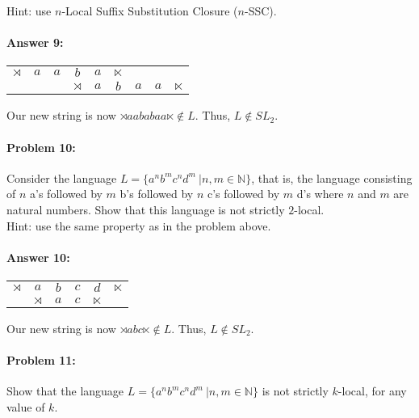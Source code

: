 \documentclass[12pt, letterpaper]{article}
\begin{document}
\noindent Hint: use $n$-Local Suffix Substitution Closure ($n$-SSC).

\paragraph{Answer 9:}\begin{center}
\begin{tabular}{cccc|c|cccc}
    $\rtimes$ & $a$ & $a$ & $b$ & $a$ & $\ltimes$  \\
    & & & $\rtimes$ & $a$ & $b$ & $a$ & $a$ & $\ltimes$
\end{tabular}    
\end{center}

Our new string is now $\rtimes aababaa \ltimes \notin L$. Thus, $L \notin SL_2$.

\hrulefill
\paragraph{Problem 10:}

Consider the language
$L= \{a^n b^m c^n d^m\ | n, m \in \mathbb{N} \}$, that is, the
language consisting of $n$ a's followed by $m$ b's followed by $n$ c's
followed by $m$ d's where $n$ and $m$ are
natural numbers. Show that this language is not strictly $2$-local.\\

\noindent Hint: use the same property as in the problem above.

\paragraph{Answer 10:}\begin{center}
\begin{tabular}{ccc|c|cc}
    $\rtimes$ & $a$ & $b$ & $c$ & $d$ & $\ltimes$ \\
    & $\rtimes$ & $a$ & $c$ & $\ltimes$
\end{tabular}
\end{center}

Our new string is now $\rtimes abc \ltimes \notin L$. Thus, $L \notin SL_2$.

\hrulefill
\paragraph{Problem 11:}

Show that the language $L= \{a^n b^m c^n d^m\ | n, m \in \mathbb{N} \}$ is not
strictly $k$-local, for any value of $k$.
\end{document}
